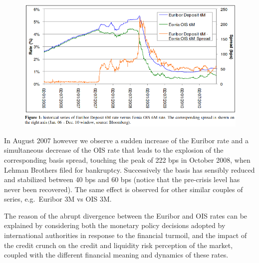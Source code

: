 \begin{figure}[h]
\centering
\includegraphics[width=0.7\linewidth]{credit_crunch.png}
\end{figure}

In August 2007 however we observe a sudden increase of the Euribor rate and a simultaneous decrease of the OIS rate that leads to the explosion of the corresponding basis spread, touching the peak of 222 bps in October 2008, when Lehman Brothers filed for bankruptcy. Successively the basis has sensibly reduced and stabilized between 40 bps and 60 bps (notice that the pre-crisis level has never been recovered). The same effect is observed for other similar couples of series, e.g.~Euribor 3M vs OIS 3M.

The reason of the abrupt divergence between the Euribor and OIS rates can be explained by considering both the monetary policy decisions adopted by international authorities in response to the financial turmoil, and the impact of the credit crunch on the credit and liquidity risk perception of the market, coupled with the different financial meaning and dynamics of these rates.

